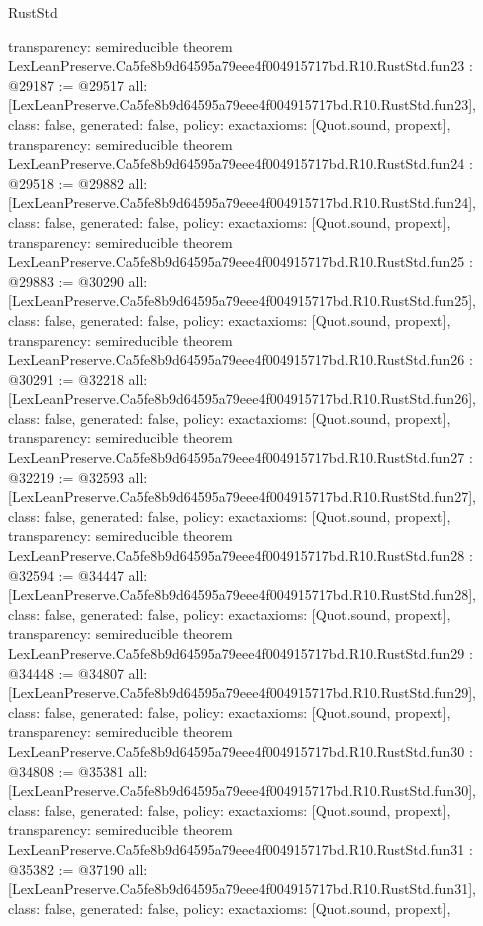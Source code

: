 \begin{lexlean}{RustStd}
\begin{coremodule}
{  transparency: semireducible
}
theorem LexLeanPreserve.Ca5fe8b9d64595a79eee4f004915717bd.R10.RustStd.fun23 : @29187 := @29517 {
  all: [LexLeanPreserve.Ca5fe8b9d64595a79eee4f004915717bd.R10.RustStd.fun23],
  class: false,
  generated: false,
  policy: exact{axioms: [Quot.sound, propext]},
  transparency: semireducible
}
theorem LexLeanPreserve.Ca5fe8b9d64595a79eee4f004915717bd.R10.RustStd.fun24 : @29518 := @29882 {
  all: [LexLeanPreserve.Ca5fe8b9d64595a79eee4f004915717bd.R10.RustStd.fun24],
  class: false,
  generated: false,
  policy: exact{axioms: [Quot.sound, propext]},
  transparency: semireducible
}
theorem LexLeanPreserve.Ca5fe8b9d64595a79eee4f004915717bd.R10.RustStd.fun25 : @29883 := @30290 {
  all: [LexLeanPreserve.Ca5fe8b9d64595a79eee4f004915717bd.R10.RustStd.fun25],
  class: false,
  generated: false,
  policy: exact{axioms: [Quot.sound, propext]},
  transparency: semireducible
}
theorem LexLeanPreserve.Ca5fe8b9d64595a79eee4f004915717bd.R10.RustStd.fun26 : @30291 := @32218 {
  all: [LexLeanPreserve.Ca5fe8b9d64595a79eee4f004915717bd.R10.RustStd.fun26],
  class: false,
  generated: false,
  policy: exact{axioms: [Quot.sound, propext]},
  transparency: semireducible
}
theorem LexLeanPreserve.Ca5fe8b9d64595a79eee4f004915717bd.R10.RustStd.fun27 : @32219 := @32593 {
  all: [LexLeanPreserve.Ca5fe8b9d64595a79eee4f004915717bd.R10.RustStd.fun27],
  class: false,
  generated: false,
  policy: exact{axioms: [Quot.sound, propext]},
  transparency: semireducible
}
theorem LexLeanPreserve.Ca5fe8b9d64595a79eee4f004915717bd.R10.RustStd.fun28 : @32594 := @34447 {
  all: [LexLeanPreserve.Ca5fe8b9d64595a79eee4f004915717bd.R10.RustStd.fun28],
  class: false,
  generated: false,
  policy: exact{axioms: [Quot.sound, propext]},
  transparency: semireducible
}
theorem LexLeanPreserve.Ca5fe8b9d64595a79eee4f004915717bd.R10.RustStd.fun29 : @34448 := @34807 {
  all: [LexLeanPreserve.Ca5fe8b9d64595a79eee4f004915717bd.R10.RustStd.fun29],
  class: false,
  generated: false,
  policy: exact{axioms: [Quot.sound, propext]},
  transparency: semireducible
}
theorem LexLeanPreserve.Ca5fe8b9d64595a79eee4f004915717bd.R10.RustStd.fun30 : @34808 := @35381 {
  all: [LexLeanPreserve.Ca5fe8b9d64595a79eee4f004915717bd.R10.RustStd.fun30],
  class: false,
  generated: false,
  policy: exact{axioms: [Quot.sound, propext]},
  transparency: semireducible
}
theorem LexLeanPreserve.Ca5fe8b9d64595a79eee4f004915717bd.R10.RustStd.fun31 : @35382 := @37190 {
  all: [LexLeanPreserve.Ca5fe8b9d64595a79eee4f004915717bd.R10.RustStd.fun31],
  class: false,
  generated: false,
  policy: exact{axioms: [Quot.sound, propext]},
}
\end{coremodule}
\end{lexlean}
